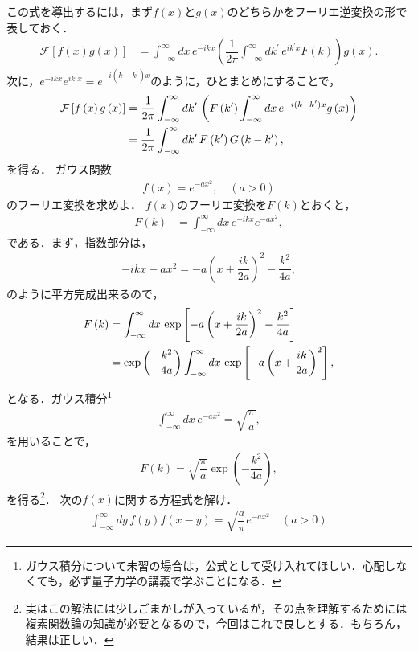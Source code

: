 この式を導出するには，まず$f(x)$と$g(x)$のどちらかをフーリエ逆変換の形で表しておく．
\begin{align}
  \mathcal{F}\left[f\left(x\right)g\left(x\right)\right]
  &= \int_{-\infty}^{\infty}dx\,e^{-ikx}\left(\dfrac{1}{2\pi}\int_{-\infty}^{\infty}dk^{\prime}\,e^{ik^{\prime}x}F\left(k\right)\right)g\left(x\right). 
\end{align}
次に，$e^{-ikx}e^{ik^{\prime}x} = e^{-i(k-k^{\prime})x}$のように，ひとまとめにすることで，
\begin{align}
  \mathcal{F}\left[f\left(x\right)g\left(x\right)\right]
  &= \dfrac{1}{2\pi}\int_{-\infty}^{\infty}dk^{\prime}\,\left(F\left(k^{\prime}\right)\int_{-\infty}^{\infty}dx\,e^{-i(k-k^\prime)x}g\left(x\right)\right) \notag \\
  &= \dfrac{1}{2\pi}\int_{-\infty}^{\infty}dk^{\prime}\,F\left(k^{\prime}\right)G\left(k-k^{\prime}\right),
\end{align}
を得る．
%
\newpage
\gl
\reidai
ガウス関数
\begin{align}
  f\left(x\right) = e^{-ax^2}, \quad (a>0)
\end{align}
のフーリエ変換を求めよ．
\vspace*{.2cm}
\gl
\vspace*{.2cm}
%
$f(x)$のフーリエ変換を$F(k)$とおくと，
\begin{align}
 F(k) & = \int_{-\infty}^{\infty}dx\, e^{-ikx}e^{-ax^2},
\end{align}
である．まず，指数部分は，
\begin{align}
 -ikx - ax^2 = -a\left(x+\dfrac{ik}{2a}\right)^2 -\dfrac{k^2}{4a}, 
\end{align}
のように平方完成出来るので，
\begin{align}
  F\left(k\right)
  &= \int_{-\infty}^{\infty}dx\,\exp\left[-a\left(x+\dfrac{ik}{2a}\right)^2-\dfrac{k^2}{4a}\right] \notag \\
  &= \exp\left(-\dfrac{k^2}{4a}\right) \int_{-\infty}^{\infty}dx\,\exp\left[-a\left(x+\dfrac{ik}{2a}\right)^2\right], 
\end{align}
となる．ガウス積分\footnote{ガウス積分について未習の場合は，公式として受け入れてほしい．心配しなくても，必ず量子力学の講義で学ぶことになる．}
\begin{align}
 \int_{-\infty}^{\infty}dx\,e^{-ax^2} = \sqrt{\dfrac{\pi}{a}}, 
\end{align}
を用いることで，
\begin{align}
  F\left(k\right) = \sqrt{\dfrac{\pi}{a}}\exp\left(-\dfrac{k^2}{4a}\right), 
\end{align}
を得る\footnote{実はこの解法には少しごまかしが入っているが，その点を理解するためには複素関数論の知識が必要となるので，今回はこれで良しとする．もちろん，結果は正しい．}．
%
\newpage
\gl
\reidai
次の$f(x)$に関する方程式を解け．
\begin{align}
  \int_{-\infty}^{\infty}dy\,f(y)f(x-y) = \sqrt{\dfrac{a}{\pi}}e^{-ax^2} \quad (a>0) 
\end{align}
\gl
\vspace*{.2cm}

